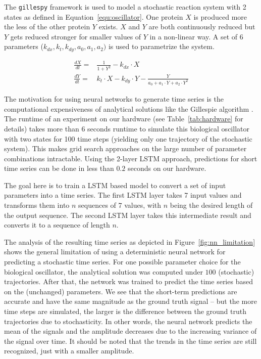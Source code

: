 The \texttt{gillespy} framework is used to 
model a stochastic reaction system with 2 states as defined 
in Equation~\ref{equ:oscillator}.
One protein $X$ is produced more the less of the other protein $Y$
exists. $X$ and $Y$ are both continuously reduced but $Y$ gets reduced stronger
for smaller values of $Y$ in a non-linear way. A set of 6 parameters
($k_{dx}, k_t, k_{dy}, a_0, a_1, a_2)$
is used to parametrize the system.

\begin{align}
    \frac{dX}{dt} = & \frac{1}{1+Y^2} - k_{dx} \cdot X                                           \\
    \frac{dY}{dt} = & k_t \cdot X - k_{dy} \cdot Y - \frac{Y}{a_0 + a_1 \cdot Y + a_2 \cdot Y^2}
    \label{equ:oscillator}
\end{align}

The motivation for using neural networks to generate time series is the
computational expensiveness of analytical solutions like the Gillespie
algorithm \cite{gillespie1977}. The runtime of an experiment on our hardware
(see Table~\ref{tab:hardware} for details)
takes more than 6 seconds runtime to simulate this biological oscillator with
two states for 100 time steps (yielding only one trajectory of the stochastic
system). This makes grid search approaches on the large number
of parameter
combinations intractable. Using the 2-layer LSTM approach, predictions for
short time series can be done in less than $0.2$ seconds on our hardware.

The goal here is to train a LSTM based
model to convert a set of input parameters into a time series. The first
LSTM layer
takes 7 input values and transforms them into $n$ sequences of 7 values, with
$n$ being the desired length of the output sequence. The second LSTM layer
takes this intermediate result and converts it to a sequence of length $n$.

The analysis of the resulting time series as depicted in
Figure~\ref{fig:nn_limitation} shows the general limitation of using a
deterministic neural network for predicting a stochastic time series. For one
possible parameter choice for the biological oscillator, the analytical solution
was computed under $100$ (stochastic) trajectories. After that, the network was
trained to predict the time series based on the (unchanged) parameters. We see
that the short-term predictions are accurate and have the same magnitude as the
ground truth signal -- but the more time steps are simulated, the larger is the
difference between the ground truth trajectories due to stochasticity. In other
words, the neural network predicts the mean of the signals and the amplitude
decreases due to the increasing variance of the signal over time.
It should be noted that the trends in the time series are still
recognized, just with a smaller amplitude.

